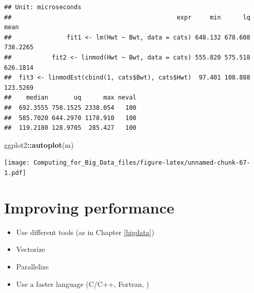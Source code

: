 \documentclass[]{book}
\newenvironment{Shaded}{\begin{snugshade}}{\end{snugshade}}
\newcommand{\KeywordTok}[1]{\textcolor[rgb]{0.13,0.29,0.53}{\textbf{#1}}}
\newcommand{\DataTypeTok}[1]{\textcolor[rgb]{0.13,0.29,0.53}{#1}}
\newcommand{\DecValTok}[1]{\textcolor[rgb]{0.00,0.00,0.81}{#1}}
\newcommand{\StringTok}[1]{\textcolor[rgb]{0.31,0.60,0.02}{#1}}
\newcommand{\CommentTok}[1]{\textcolor[rgb]{0.56,0.35,0.01}{\textit{#1}}}
\newcommand{\OperatorTok}[1]{\textcolor[rgb]{0.81,0.36,0.00}{\textbf{#1}}}
\newcommand{\NormalTok}[1]{#1}
\theoremstyle{definition}
\theoremstyle{definition}
\theoremstyle{definition}
\theoremstyle{remark}
\begin{document}
\begin{Shaded}
\end{Shaded}

\begin{verbatim}
## Unit: microseconds
##                                             expr     min      lq     mean
##               fit1 <- lm(Hwt ~ Bwt, data = cats) 648.132 678.608 738.2265
##           fit2 <- linmod(Hwt ~ Bwt, data = cats) 555.820 575.518 626.1814
##  fit3 <- linmodEst(cbind(1, cats$Bwt), cats$Hwt)  97.401 108.888 123.5269
##    median       uq      max neval
##  692.3555 750.1525 2338.054   100
##  585.7020 644.2970 1178.910   100
##  119.2180 128.9705  285.427   100
\end{verbatim}

\begin{Shaded}
\begin{Highlighting}[]
\NormalTok{ggplot2}\OperatorTok{::}\KeywordTok{autoplot}\NormalTok{(m)}
\end{Highlighting}
\end{Shaded}

\texttt{[image: Computing\_for\_Big\_Data\_files/figure-latex/unnamed-chunk-67-1.pdf]}

\section{Improving performance}\label{improving-performance}

\begin{itemize}
\item
  Use different tools (as in Chapter \ref{bigdata})
\item
  Vectorize
\item
  Parallelize
\item
  Use a faster language (C/C++, Fortran, )
\end{itemize}
\end{document}
